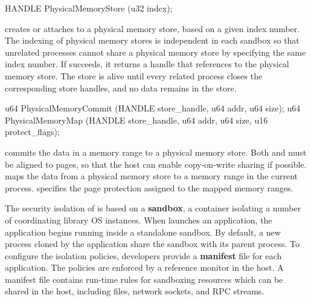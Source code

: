 

\begin{paldef}
HANDLE PhysicalMemoryStore  (u32 index);
\end{paldef}


 creates or attaches to a physical memory store,
based on a given index number.
The indexing of physical memory stores is independent in each sandbox
so that unrelated processes cannot share a physical memory store by specifying the same index number.
If  succeeds,
it returns a handle that references to the physical memory store.
The store is alive until every related process closes the corresponding store handles,
and no data remains in the store.




\begin{paldef}
u64 PhysicalMemoryCommit (HANDLE store_handle, u64 addr, u64 size);
u64 PhysicalMemoryMap    (HANDLE store_handle, u64 addr, u64 size,
                          u16 protect_flags);
\end{paldef}


 commits the data in a memory range to a physical memory store.
Both  and  must be aligned to pages,
so that the host can enable copy-on-write sharing if possible.
 maps the data from a physical memory store
to a memory range in the current process.
 specifies the page protection assigned to the mapped memory ranges.




\label{sec:abi:proc:sandbox}


The security isolation of \graphene{} is based on a {\bf sandbox}, a container isolating a number of coordinating library OS instances.
When \graphene{} launches an application, the application begins running inside a standalone sandbox.
By default, a new process cloned by the application share the sandbox
with its parent process.
To configure the isolation policies,
developers provide a {\bf manifest} file for each application.
The policies are enforced by a reference monitor in the host.
A manifest file contains run-time rules for sandboxing resources which can be shared in the host,
including files, network sockets, and RPC streams.



